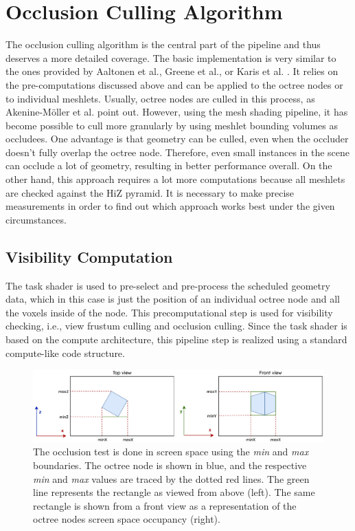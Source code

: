 \section{Occlusion Culling Algorithm} \label{sec-occlusion}

The occlusion culling algorithm is the central part of the pipeline and thus deserves a more detailed coverage. The 
basic implementation is very similar to the ones provided by Aaltonen et al., Greene et al., or Karis et al. 
\cite{Aaltonen2015,Greene93,Karis2021}. It relies on the pre-computations discussed above and can be applied to the 
octree nodes or to individual meshlets. Usually, octree nodes are culled in this process, as Akenine-Möller et al. 
\cite{AkenineMoeller2018} point out. However, using the mesh shading pipeline, it has become possible to cull more 
granularly by using meshlet bounding volumes as occludees. One advantage is that geometry can be culled, even when 
the occluder doesn't fully overlap the octree node. Therefore, even small instances in the scene can occlude a lot 
of geometry, resulting in better performance overall. On the other hand, this approach requires a lot more 
computations because all meshlets are checked against the \ac{HiZ} pyramid. It is necessary to make precise 
measurements in order to find out which approach works best under the given circumstances.


\subsection*{Visibility Computation} \label{subsec-visibility-computation}

The task shader is used to pre-select and pre-process the scheduled geometry data, which in this case is just 
the position of an individual octree node and all the voxels inside of the node. This precomputational step is 
used for visibility checking, i.e., view frustum culling and occlusion culling. Since the task shader is based 
on the compute architecture, this pipeline step is realized using a standard compute-like code structure. \\
\enlargethispage{\baselineskip}

\begin{figure}[!htb]
    \centering
    \includegraphics[width=\linewidth]{images/graphics/screen_space_occlusion_test.jpg}
    \caption{The occlusion test is done in screen space using the \emph{min} and \emph{max} boundaries. The octree node 
    is shown in blue, and the respective \emph{min} and \emph{max} values are traced by the dotted red lines. The green 
    line represents the rectangle as viewed from above (left). The same rectangle is shown from a front view as a 
    representation of the octree nodes screen space occupancy (right).}
    \label{fig:screen-space-occlusion-test}
\end{figure}

